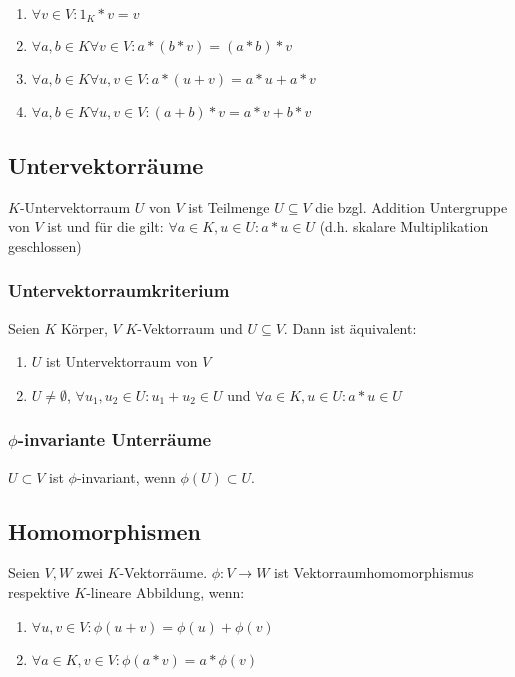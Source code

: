 \begin{enumerate}[label=(\alph*)]
	\item $\forall v \in V : 1_K * v = v$
	\item $\forall a, b \in K \forall v \in V : a*(b*v)=(a*b)*v$
	\item $\forall a, b \in K \forall u, v \in V : a*(u+v)=a*u+a*v$
	\item $\forall a, b \in K \forall u, v \in V : (a+b)*v=a*v+b*v$
\end{enumerate}

\subsection*{Untervektorräume}

$K$-Untervektorraum $U$ von $V$ ist Teilmenge $U \subseteq V$ die bzgl. Addition Untergruppe von $V$ ist und für die gilt: $\forall a \in K, u \in U : a*u \in U$ (d.h. skalare Multiplikation geschlossen)

\subsubsection*{Untervektorraumkriterium}

Seien $K$ Körper, $V$ $K$-Vektorraum und $U \subseteq V$. Dann ist äquivalent:

\begin{enumerate}[label=(\alph*)]
	\item $U$ ist Untervektorraum von $V$
	\item $U \neq \emptyset$, $\forall u_1, u_2 \in U : u_1 + u_2 \in U$ und $\forall a \in K, u \in U : a*u \in U$
\end{enumerate}

\subsubsection*{$\phi$-invariante Unterräume}

$U \subset V$ ist $\phi$-invariant, wenn $\phi(U) \subset U$.

\subsection*{Homomorphismen}

Seien $V, W$ zwei $K$-Vektorräume. $\phi : V \rightarrow W$ ist Vektorraumhomomorphismus respektive $K$-lineare Abbildung, wenn:

\begin{enumerate}[label=(\alph*)]
	\item $\forall u, v \in  V : \phi(u+v) = \phi(u)+\phi(v)$
	\item $\forall a \in K, v \in V : \phi(a*v) = a*\phi(v)$
\end{enumerate}

